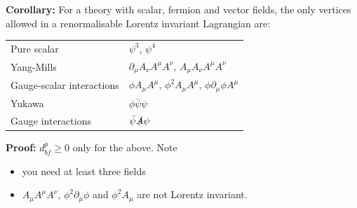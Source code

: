 \newline
\textbf{Corollary: } For a theory with scalar, fermion and vector fields, the only vertices allowed in a renormalisable Lorentz invariant Lagrangian are:
\begin{table}[h!]
\begin{tabular}{ll}
 Pure scalar & $\psi^3$, $\psi^4$  \\
 Yang-Mills &  $\partial_\mu A_\nu A^\mu A^\nu$, $A_\mu A_\nu A^\mu A^\nu$ \\
 Gauge-scalar interactions & $\phi A_\mu A^\mu$, $\phi^2 A_\mu A^\mu$, $\phi \partial_\mu \phi A^\mu$ \\
 Yukawa &  $\phi \bar{\psi} \psi$ \\
 Gauge interactions & $\bar{\psi} \slashed{A} \psi$
\end{tabular}
\end{table}
\newline
\textbf{Proof: } $d^p_{bf} \geq 0$ only for the above. Note
\begin{itemize}
\item you need at least three fields
\item $A_\mu A^\mu A^\nu$, $\phi^2 \partial_\mu \phi$ and $\phi^2 A_\mu$ are not Lorentz invariant.
\end{itemize}
%
